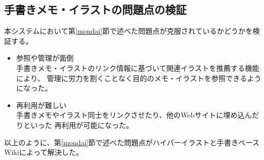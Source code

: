\subsection{手書きメモ・イラストの問題点の検証}
本システムにおいて第\ref{mondai}節で述べた問題点が克服されているかどうかを検証する。
\begin{itemize}
    \item 参照や管理が面倒\\
    手書きメモ・イラストのリンク情報に基づいて関連イラストを推薦する機能により、
    管理に労力を割くことなく目的のメモ・イラストを参照できるようになった。
    \item 再利用が難しい\\
    手書きメモやイラスト同士をリンクさせたり、他のWebサイトに埋め込んだりといった
    再利用が可能になった。
\end{itemize}
以上のように、第\ref{mondai}節で述べた問題点がハイパーイラストと手書きベースWikiによって解決した。